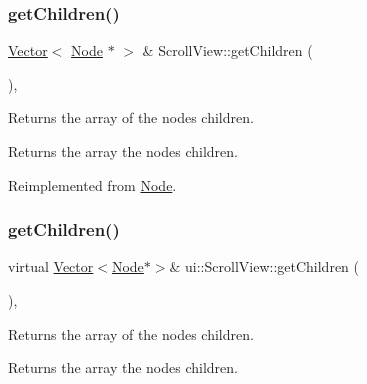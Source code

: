 \mbox{\label{classui_1_1ScrollView_abde6bf60f60db8d75ac5a63aa0f47dbc}} 
\subsubsection{\texorpdfstring{get\+Children()}{getChildren()}\hspace{0.1cm}{\footnotesize\ttfamily [1/2]}}
{\footnotesize\ttfamily \hyperlink{classVector}{Vector}$<$ \hyperlink{classNode}{Node} $\ast$ $>$ \& Scroll\+View\+::get\+Children (\begin{DoxyParamCaption}{ }\end{DoxyParamCaption})\hspace{0.3cm}{\ttfamily [override]}, {\ttfamily [virtual]}}

Returns the array of the node\textquotesingle{}s children.

\begin{DoxyReturn}{Returns}
the array the node\textquotesingle{}s children. 
\end{DoxyReturn}


Reimplemented from \hyperlink{classNode_a25943a94b19e37929b18f93647b58153}{Node}.

\mbox{\label{classui_1_1ScrollView_adf13c7fc4c49dc4030dd4482f7de62b7}} 
\subsubsection{\texorpdfstring{get\+Children()}{getChildren()}\hspace{0.1cm}{\footnotesize\ttfamily [2/2]}}
{\footnotesize\ttfamily virtual \hyperlink{classVector}{Vector}$<$\hyperlink{classNode}{Node}$\ast$$>$\& ui\+::\+Scroll\+View\+::get\+Children (\begin{DoxyParamCaption}{ }\end{DoxyParamCaption})\hspace{0.3cm}{\ttfamily [override]}, {\ttfamily [virtual]}}

Returns the array of the node\textquotesingle{}s children.

\begin{DoxyReturn}{Returns}
the array the node\textquotesingle{}s children. 
\end{DoxyReturn}


